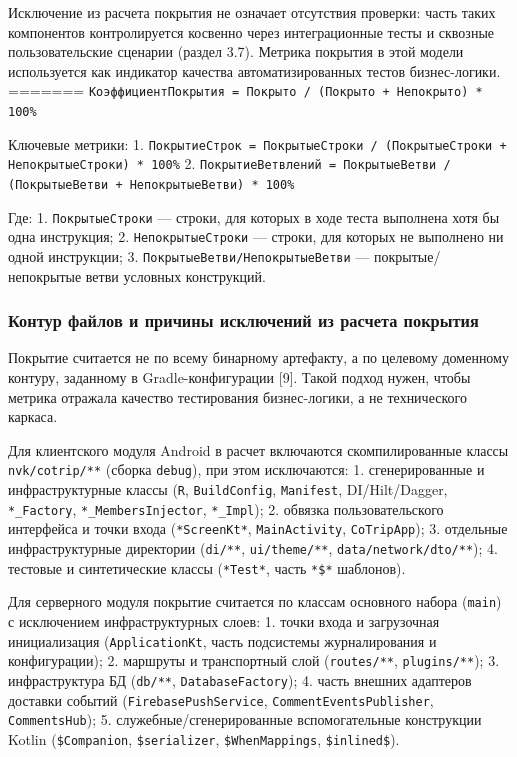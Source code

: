 Исключение из расчета покрытия не означает отсутствия проверки: часть таких компонентов контролируется косвенно через интеграционные тесты и сквозные пользовательские сценарии (раздел 3.7). Метрика покрытия в этой модели используется как индикатор качества автоматизированных тестов бизнес-логики.
=======
\texttt{КоэффициентПокрытия = Покрыто / (Покрыто + Непокрыто) * 100\%}

Ключевые метрики:
1. \texttt{ПокрытиеСтрок = ПокрытыеСтроки / (ПокрытыеСтроки + НепокрытыеСтроки) * 100\%}
2. \texttt{ПокрытиеВетвлений = ПокрытыеВетви / (ПокрытыеВетви + НепокрытыеВетви) * 100\%}

Где:
1. \texttt{ПокрытыеСтроки} --- строки, для которых в ходе теста выполнена хотя бы одна инструкция;
2. \texttt{НепокрытыеСтроки} --- строки, для которых не выполнено ни одной инструкции;
3. \texttt{ПокрытыеВетви/НепокрытыеВетви} --- покрытые/непокрытые ветви условных конструкций.

\subsubsection{Контур файлов и причины исключений из расчета покрытия}

Покрытие считается не по всему бинарному артефакту, а по целевому доменному контуру, заданному в Gradle-конфигурации [9]. Такой подход нужен, чтобы метрика отражала качество тестирования бизнес-логики, а не технического каркаса.

Для клиентского модуля Android в расчет включаются скомпилированные классы \texttt{nvk/cotrip/**} (сборка \texttt{debug}), при этом исключаются:
1. сгенерированные и инфраструктурные классы (\texttt{R}, \texttt{BuildConfig}, \texttt{Manifest}, DI/Hilt/Dagger, \texttt{*\_Factory}, \texttt{*\_MembersInjector}, \texttt{*\_Impl});
2. обвязка пользовательского интерфейса и точки входа (\texttt{*ScreenKt*}, \texttt{MainActivity}, \texttt{CoTripApp});
3. отдельные инфраструктурные директории (\texttt{di/**}, \texttt{ui/theme/**}, \texttt{data/network/dto/**});
4. тестовые и синтетические классы (\texttt{*Test*}, часть \texttt{*\$*} шаблонов).

Для серверного модуля покрытие считается по классам основного набора (\texttt{main}) с исключением инфраструктурных слоев:
1. точки входа и загрузочная инициализация (\texttt{ApplicationKt}, часть подсистемы журналирования и конфигурации);
2. маршруты и транспортный слой (\texttt{routes/**}, \texttt{plugins/**});
3. инфраструктура БД (\texttt{db/**}, \texttt{DatabaseFactory});
4. часть внешних адаптеров доставки событий (\texttt{FirebasePushService}, \texttt{CommentEventsPublisher}, \texttt{CommentsHub});
5. служебные/сгенерированные вспомогательные конструкции Kotlin (\texttt{\$Companion}, \texttt{\$serializer}, \texttt{\$WhenMappings}, \texttt{\$inlined\$}).

